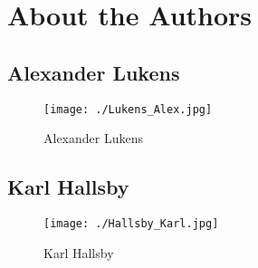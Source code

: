 \chapter{About the Authors}\label{chap:About_Authors}
\section*{Alexander Lukens}\label{sec:Alexander_Lukens}
\begin{figure}[h!tbp]
  \centering
  \texttt{[image: ./Lukens\_Alex.jpg]}
  \caption*{Alexander Lukens}
  \label{fig:Alexander_Lukens}
\end{figure}

\section*{Karl Hallsby}\label{sec:Karl_Hallsby}
\begin{figure}[h!tbp]
  \centering
  \texttt{[image: ./Hallsby\_Karl.jpg]}
  \caption*{Karl Hallsby}
  \label{fig:Karl_Hallsby}
\end{figure}

